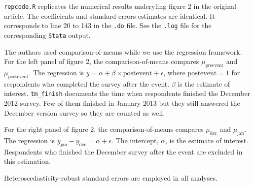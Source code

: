 \documentclass[11pt]{article}
\begin{document}
\texttt{repcode.R} replicates the numerical results underyling figure 2 in the original article.
The coefficients and standard errors estimates are identical.
It corresponds to line 20 to 143 in the \texttt{.do} file. See the \texttt{.log} file for the corresponding \texttt{Stata} output. 

The authors used comparison-of-means while we use the regression framework. 
For the left panel of figure 2, the comparison-of-means compares \(\mu_{\text{preevent}}\) and \(\mu_{\text{postevent}}\). The regression is \(y = \alpha + \beta \times \text{postevent} + \epsilon\), where \(\text{postevent} = 1\) for respondents who completed the survey after the event. \(\beta\) is the estimate of interest. \texttt{tm\_finish} documents the time when respondents finished the December 2012 survey. Few of them finished in January 2013 but they still answered the December version survey so they are counted as well.

For the right panel of figure 2, the comparison-of-means compares \(\mu_{\text{dec}}\) and \(\mu_{\text{jan}}\). The regression is \(y_{\text{jan}} - y_{\text{dec}} = \alpha + \epsilon\). The intercept, \(\alpha\), is the estimate of interest. Respondents who finished the December survey after the event are excluded in this estimation.

Heteroscedasticity-robust standard errors are employed in all analyses.
\end{document}
